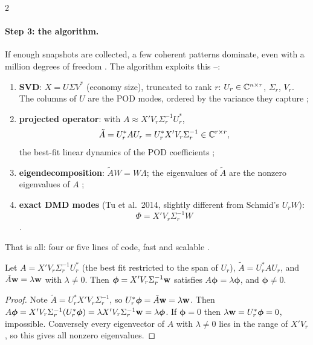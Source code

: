 \begin{paracol}{2}
\paragraph{Step 3: the algorithm.} If enough snapshots are collected, a few coherent patterns dominate,
even with a million degrees of freedom . The algorithm exploits this
--:
\begin{enumerate}
  \item \textbf{SVD}: $X=U\Sigma V^*$ (economy size), truncated to rank $r$: $U_r\in\mathbb{C}^{n\times r}$,
        $\Sigma_r$, $V_r$. The columns of $U$ are the POD modes, ordered by the variance they capture
        ;
  \item \textbf{projected operator}: with $A\approx X'V_r\Sigma_r^{-1}U_r^*$,
        \begin{equation}\label{eq:dmd-Atilde}
          \tilde A=U_r^*AU_r=U_r^*X'V_r\Sigma_r^{-1}\in\mathbb{C}^{r\times r},
        \end{equation}
        the best-fit linear dynamics of the POD coefficients ;
  \item \textbf{eigendecomposition}: $\tilde AW=W\Lambda$; the eigenvalues of $\tilde A$ are the nonzero
        eigenvalues of $A$ ;
  \item \textbf{exact DMD modes} (Tu et al.\ 2014, slightly different from Schmid's $U_rW$):
        \begin{equation}\label{eq:dmd-Phi}
          \Phi=X'V_r\Sigma_r^{-1}W
        \end{equation}
        .
\end{enumerate}
That is all: four or five lines of code, fast and scalable .

\begin{proposition}\label{prop:dmd-exact}
Let $A=X'V_r\Sigma_r^{-1}U_r^*$ (the best fit restricted to the span of $U_r$), $\tilde A=U_r^*AU_r$, and
$\tilde A\mathbf{w}=\lambda\mathbf{w}$ with $\lambda\neq0$. Then $\boldsymbol\phi=X'V_r\Sigma_r^{-1}\mathbf{w}$ satisfies
$A\boldsymbol\phi=\lambda\boldsymbol\phi$, and $\boldsymbol\phi\neq0$.
\end{proposition}
\begin{proof}
Note $\tilde A=U_r^*X'V_r\Sigma_r^{-1}$, so $U_r^*\boldsymbol\phi=\tilde A\mathbf{w}=\lambda\mathbf{w}$. Then
$A\boldsymbol\phi=X'V_r\Sigma_r^{-1}(U_r^*\boldsymbol\phi)=\lambda X'V_r\Sigma_r^{-1}\mathbf{w}=\lambda\boldsymbol\phi$.
If $\boldsymbol\phi=0$ then $\lambda\mathbf{w}=U_r^*\boldsymbol\phi=0$, impossible. Conversely every eigenvector
of $A$ with $\lambda\ne0$ lies in the range of $X'V_r$, so this gives all nonzero eigenvalues.
\end{proof}


\end{paracol}
